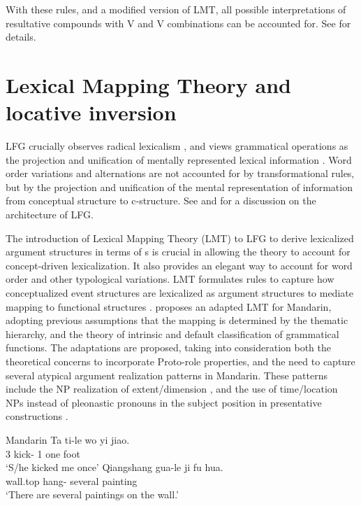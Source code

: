\documentclass[output=paper,chinesefont,hidelinks]{langscibook}
\begin{document}
With these rules, and a modified version of LMT, all possible interpretations of resultative compounds with V and V combinations can be accounted for. See \citet{Her2007a} for details.

\section{Lexical Mapping Theory and locative inversion}
\label{sec:Sinitic:4.4}

LFG crucially observes radical lexicalism \citep{Karttunen89}, and views grammatical operations as the projection and unification of mentally represented lexical information \citep{bresnan82}. Word order variations and alternations are not accounted for by transformational rules, but by the projection and unification of the mental representation of information from conceptual structure to c-structure. See  and  for a discussion on the architecture of LFG.

The introduction of Lexical Mapping Theory (LMT) to LFG to derive lexicalized argument structures in terms of {\GF}s is crucial in allowing the theory to account for concept-driven lexicalization. It also provides an elegant way to account for word order and other typological variations. LMT formulates rules to capture how conceptualized event structures are lexicalized as argument structures to mediate mapping to functional structures \citep{bresnan1989locative,Alsina:PhD}. \citet{Huang1993a} proposes an adapted LMT for Mandarin, adopting previous assumptions that the mapping is determined by the thematic hierarchy, and the theory of intrinsic and default classification of grammatical functions. The adaptations are proposed, taking into consideration both the theoretical concerns to incorporate  Proto-role properties, and the need to capture several atypical argument realization patterns in Mandarin. These patterns include the NP realization of extent/dimension , and the use of time/location NPs instead of pleonastic pronouns in the subject position in presentative constructions .

\ea%
    \label{ex:Sinitic:54} Mandarin
    \ea\label{ex:Sinitic:54a}
    \gll Ta  ti-le     wo  {yi}   {jiao}.\\
         3{\SG}  kick-{\PFV}  1{\SG}  one  foot\\
    \glt `S/he kicked me once'
    \ex\label{ex:Sinitic:54b}
    \gll Qiangshang  gua-le    ji   fu   hua.\\
         wall.top  hang-{\PFV}  several {\CLF}  painting\\
    \glt`There are several paintings on the wall.'
    \z\z
\end{document}
